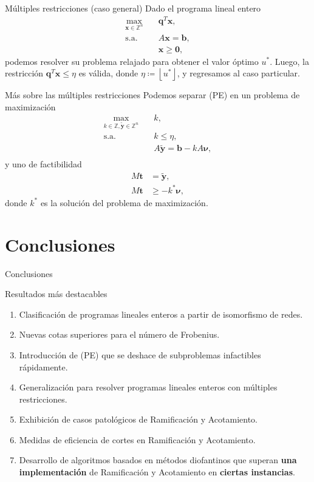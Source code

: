 \documentclass[aspectratio=169]{beamer}
\theoremstyle{definition}
\newcommand{\Z}{\mathbb{Z}}
\renewcommand{\vec}[1]{\boldsymbol{#1}}
\newcommand{\tvec}[1]{\vec{\tilde{#1}}}
\newcommand{\floor}[1]{\left\lfloor #1 \right\rfloor}
\begin{document}
\begin{frame}{Múltiples restricciones (caso general)}
	Dado el programa lineal entero
	\begin{align*}
		\max_{\vec{x} \in \Z^n} \quad & \vec{q}^T\vec{x}, \\
		\text{s.a.} \quad
			& A\vec{x} = \vec{b}, \\
			& \vec{x} \geq \vec{0},
	\end{align*}
	podemos resolver su problema relajado para obtener el valor óptimo $u^*$. Luego, la restricción
	$\vec{q}^T\vec{x} \leq \eta$ es válida, donde $\eta \coloneq \floor{u^*}$, y regresamos al caso
	particular.
\end{frame}

\begin{frame}{Más sobre las múltiples restricciones}
	Podemos separar (PE) en un problema de maximización
	\begin{align*}
		\max_{k \in \Z, \tvec{y} \in \Z^n} \quad & k, \\
		\text{s.a.} \quad & k \leq \eta, \\
						  & A \tvec{y} = \vec{b} - kA\vec{\nu}, \\
	\end{align*}
	y uno de factibilidad
	\begin{align*}
		M\vec{t} &= \tvec{y}, \\
		M\vec{t} &\geq -k^*\vec{\nu},
	\end{align*}
	donde $k^*$ es la solución del problema de maximización.
\end{frame}

\section{Conclusiones}
\begin{frame}
	\centering
	\Large{Conclusiones}
\end{frame}


\begin{frame}{Resultados más destacables}
	\begin{enumerate}
		\item Clasificación de programas lineales enteros a partir de isomorfismo de redes.
		\item Nuevas cotas superiores para el número de Frobenius.
		\item Introducción de (PE) que se deshace de subproblemas infactibles rápidamente.
		\item Generalización para resolver programas lineales enteros con múltiples restricciones.
		\item Exhibición de casos patológicos de Ramificación y Acotamiento.
		\item Medidas de eficiencia de cortes en Ramificación y Acotamiento.
		\item Desarrollo de algoritmos basados en métodos diofantinos que superan \textbf{una
			implementación} de Ramificación y Acotamiento en \textbf{ciertas instancias}.
	\end{enumerate}
\end{frame}
\end{document}
